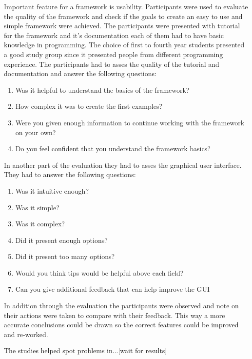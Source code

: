 Important feature for a framework is usability. Participants were used to evaluate the quality of the framework and check if the goals
to create an easy to use and simple framework were achieved. The participants were presented with tutorial for the framework and it's documentation
each of them had to have basic knowledge in programming. The choice of first to fourth year students presented a good study group since it presented people
from different programming experience. The participants had to asses the quality of the 
tutorial and documentation and answer the following questions:

\begin{enumerate}
\item Was it helpful to understand the basics of the framework?
\item How complex it was to create the first examples? 
\item Were you given enough information to continue working with the framework on your own?
\item Do you feel confident that you understand the framework basics? 
\end{enumerate}
 
In another part of the evaluation they had to asses the graphical user interface. They had to answer the following questions: 

\begin{enumerate}
\item Was it intuitive enough?
\item Was it simple?
\item Was it complex? 
\item Did it present enough options?
\item Did it present too many options?
\item Would you think tips would be helpful above each field?
\item Can you give additional feedback that can help improve the GUI
\end{enumerate}

In addition through the evaluation the participants were observed and note on their actions were taken to compare with their feedback. This way a more
accurate conclusions could be drawn so the correct features could be improved and re-worked.

The studies helped spot problems in...[wait for results] 